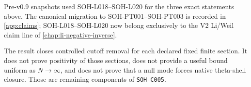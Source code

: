 Pre-v0.9 snapshots used SOH-L018--SOH-L020 for the three exact statements above.
The canonical migration to SOH-PT001--SOH-PT003 is recorded in
\cref{app:claims}; SOH-L018--SOH-L020 now belong exclusively to the V2 Li/Weil
claim line of \cref{chap:li-negative-inverse}.

The result closes controlled cutoff removal for each declared fixed finite
section. It does not prove positivity of those sections, does not provide a
useful bound uniform as $N\to\infty$, and does not prove that a null mode forces
native theta-shell closure. Those are remaining components of
\texttt{SOH-C005}.
